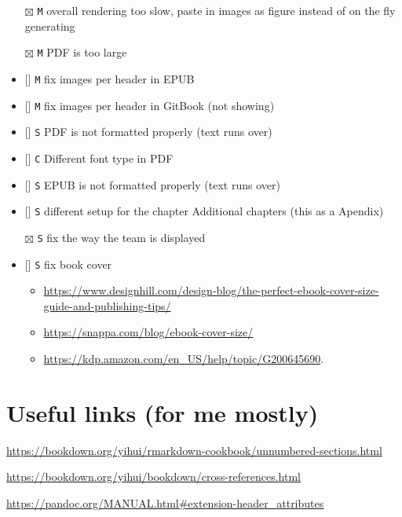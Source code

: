 \documentclass[
]{book}
\newcommand{\passthrough}[1]{#1}
\providecommand{\tightlist}{%
  \setlength{\itemsep}{0pt}\setlength{\parskip}{0pt}}
\begin{document}
\begin{itemize}
\tightlist
\item[$\boxtimes$]
  \passthrough{\lstinline!M!} overall rendering too slow, paste in images as figure instead of on the fly generating
\item[$\boxtimes$]
  \passthrough{\lstinline!M!} PDF is too large
\item
  {[}{]} \passthrough{\lstinline!M!} fix images per header in EPUB
\item
  {[}{]} \passthrough{\lstinline!M!} fix images per header in GitBook (not showing)
\item
  {[}{]} \passthrough{\lstinline!S!} PDF is not formatted properly (text runs over)
\item
  {[}{]} \passthrough{\lstinline!C!} Different font type in PDF
\item
  {[}{]} \passthrough{\lstinline!S!} EPUB is not formatted properly (text runs over)
\item
  {[}{]} \passthrough{\lstinline!S!} different setup for the chapter Additional chapters (this as a Apendix)
\item[$\boxtimes$]
  \passthrough{\lstinline!S!} fix the way the team is displayed
\item
  {[}{]} \passthrough{\lstinline!S!} fix book cover

  \begin{itemize}
  \tightlist
  \item
    \url{https://www.designhill.com/design-blog/the-perfect-ebook-cover-size-guide-and-publishing-tips/}
  \item
    \url{https://snappa.com/blog/ebook-cover-size/}
  \item
    \url{https://kdp.amazon.com/en_US/help/topic/G200645690}.
  \end{itemize}
\end{itemize}

\hypertarget{useful-links-for-me-mostly}{%
\section{Useful links (for me mostly)}\label{useful-links-for-me-mostly}}

\url{https://bookdown.org/yihui/rmarkdown-cookbook/unnumbered-sections.html}

\url{https://bookdown.org/yihui/bookdown/cross-references.html}

\url{https://pandoc.org/MANUAL.html\#extension-header_attributes}
\end{document}
